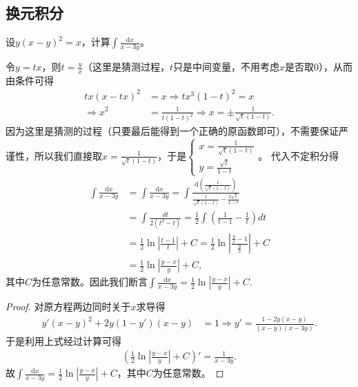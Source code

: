 \documentclass[../../main.tex]{subfiles}
\begin{document}
\subsection{换元积分}

\begin{example}
设\(y(x - y)^2 = x\)，计算\(\int \frac{\mathrm{d}x}{x - 3y}\)。 
\end{example}
\begin{note}
令\(y = tx\)，则\(t = \frac{y}{x}\)（这里是猜测过程，\(t\)只是中间变量，不用考虑\(x\)是否取\(0\)），从而由条件可得
\begin{align*}
tx(x - tx)^2 &= x \Rightarrow tx^3(1 - t)^2 = x\\
\Rightarrow x^2&=\frac{1}{t(1 - t)^2} \Rightarrow x = \pm\frac{1}{\sqrt{t}(1 - t)}.
\end{align*}
因为这里是猜测的过程（只要最后能得到一个正确的原函数即可），不需要保证严谨性，所以我们直接取\(x=\frac{1}{\sqrt{t}(1 - t)}\)，于是\(\begin{cases}
x=\frac{1}{\sqrt{t}(1 - t)}\\
y=\frac{\sqrt{t}}{1 - t}
\end{cases}\)。
代入不定积分得
\begin{align*}
\int{\frac{\mathrm{d}x}{x - 3y}}&=\int{\frac{\mathrm{d}x}{x - 3y}}=\int{\frac{\mathrm{d}\left(\frac{1}{\sqrt{t}(1 - t)}\right)}{\frac{1}{\sqrt{t}(1 - t)}-\frac{3\sqrt{t}}{1 - t}}}\\
&=\int{\frac{dt}{2(t^2 - t)}}=\frac{1}{2}\int{\left(\frac{1}{t - 1}-\frac{1}{t}\right)dt}\\
&=\frac{1}{2}\ln\left|\frac{t - 1}{t}\right| + C=\frac{1}{2}\ln\left|\frac{\frac{y}{x}-1}{\frac{y}{x}}\right| + C\\
&=\frac{1}{2}\ln\left|\frac{y - x}{y}\right| + C,
\end{align*}
其中\(C\)为任意常数。因此我们断言\(\int{\frac{\mathrm{d}x}{x - 3y}}=\frac{1}{2}\ln\left|\frac{y - x}{y}\right| + C\).
\end{note}
\begin{proof}
对原方程两边同时关于\(x\)求导得
\begin{align*}
y'(x - y)^2 + 2y(1 - y')(x - y) &= 1 \Rightarrow y'=\frac{1 - 2y(x - y)}{(x - y)(x - 3y)}.
\end{align*}
于是利用上式经过计算可得
\begin{align*}
\left(\frac{1}{2}\ln\left|\frac{y - x}{y}\right| + C\right)'=\frac{1}{x - 3y}.
\end{align*}
故\(\int{\frac{\mathrm{d}x}{x - 3y}}=\frac{1}{2}\ln\left|\frac{y - x}{y}\right| + C\)，其中\(C\)为任意常数。 
\end{proof}
\end{document}
